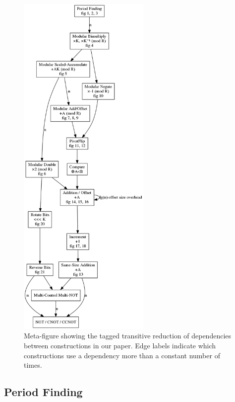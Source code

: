 \documentclass[twocolumn]{article}
\begin{document}
\begin{figure}
  \centering
  \includegraphics[height=17.3cm]{assets/dependencies.png}
  \caption{
    Meta-figure showing the tagged transitive reduction of dependencies between constructions in our paper.
    Edge labels indicate which constructions use a dependency more than a constant number of times.
  }
  \label{fig:dependencies}
\end{figure}

\subsection{Period Finding}
\end{document}
